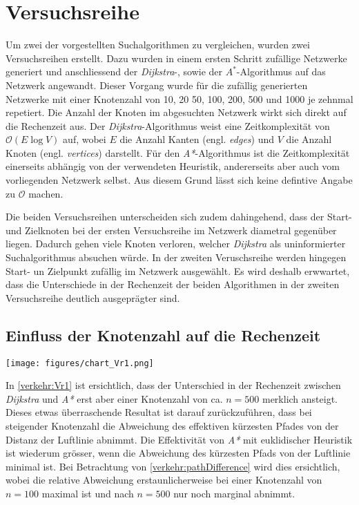 \section{Versuchsreihe}
\label{section:verkehr/versuchsreihe}

Um zwei der vorgestellten Suchalgorithmen zu vergleichen, wurden zwei Versuchsreihen erstellt. Dazu wurden in einem ersten Schritt zufällige Netzwerke generiert und anschliessend der \emph{Dijkstra}-, sowie der \emph{$A^*$}-Algorithmus auf das Netzwerk angewandt.
Dieser Vorgang wurde für die zufällig generierten Netzwerke mit einer Knotenzahl von 10, 20 50, 100, 200, 500 und 1000 je zehnmal repetiert.
Die Anzahl der Knoten im abgesuchten Netzwerk wirkt sich direkt auf die Rechenzeit aus. Der \emph{Dijkstra}-Algorithmus weist eine Zeitkomplexität von $\mathcal{O}(E\log{}V)$ auf, wobei $E$ die Anzahl Kanten (engl. \emph{edges}) und $V$ die Anzahl Knoten (engl. \emph{vertices}) darstellt.
Für den \emph{A*}-Algorithmus ist die Zeitkomplexität einerseits abhängig von der verwendeten Heuristik, andererseits aber auch vom vorliegenden Netzwerk selbst. Aus diesem Grund lässt sich keine defintive Angabe zu $\mathcal{O}$ machen.

Die beiden Versuchsreihen unterscheiden sich zudem dahingehend, dass der Start- und Zielknoten bei der ersten Versuchsreihe im Netzwerk diametral gegenüber liegen. Dadurch gehen viele Knoten verloren, welcher \emph{Dijkstra} als uninformierter Suchalgorithmus absuchen würde. In der zweiten Veruschsreihe werden hingegen Start- un Zielpunkt zufällig im Netzwerk ausgewählt. Es wird deshalb erwwartet, dass die Unterschiede in der Rechenzeit der beiden Algorithmen in der zweiten Versuchsreihe deutlich ausgeprägter sind.

\subsection{Einfluss der Knotenzahl auf die Rechenzeit}
\label{verkehr:Knotenzahl}

\begin{wrapfigure}{}
\texttt{[image: figures/chart\_Vr1.png]}

\caption{Gemessene Rechenzeiten der ersten Versuchsreihe in Abhängigkeit der Knotenzahl.}
\label{verkehr:Vr1}
\end{wrapfigure}

In \ref{verkehr:Vr1} ist ersichtlich, dass der Unterschied in der Rechenzeit zwischen \emph{Dijkstra} und \emph{A*} erst aber einer Knotenzahl von ca. $n=500$ merklich ansteigt. Dieses etwas überraschende Resultat ist darauf zurückzuführen, dass bei steigender Knotenzahl die Abweichung des effektiven kürzesten Pfades von der Distanz der Luftlinie abnimmt.
Die Effektivität von \emph{A*} mit euklidischer Heuristik ist wiederum grösser, wenn die Abweichung des kürzesten Pfads von der Luftlinie minimal ist.
Bei Betrachtung von \ref{verkehr:pathDifference} wird dies ersichtlich, wobei die relative Abweichung erstaunlicherweise bei einer Knotenzahl von $n=100$ maximal ist und nach $n=500$ nur noch marginal abnimmt.

